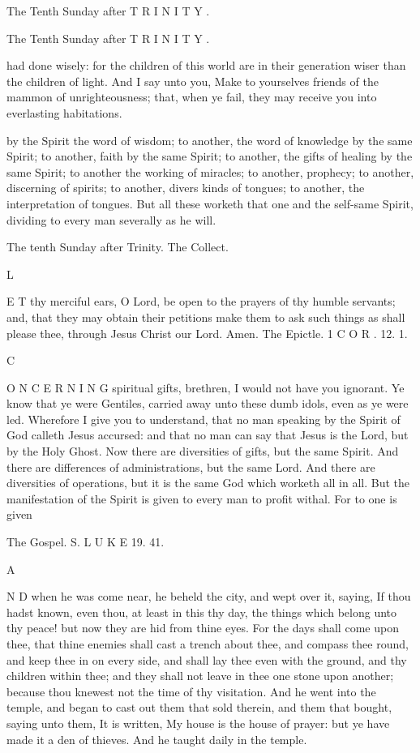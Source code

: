 The Tenth Sunday after T R I N I T Y .

The Tenth Sunday after T R I N I T Y .

had done wisely: for the children of this world are in their generation wiser than the children of light. And I say unto you, Make to yourselves friends of the mammon of unrighteousness; that, when ye fail, they may receive you into everlasting habitations.

by the Spirit the word of wisdom; to another, the word of knowledge by the same Spirit; to another, faith by the same Spirit; to another, the gifts of healing by the same Spirit; to another the working of miracles; to another, prophecy; to another, discerning of spirits; to another, divers kinds of tongues; to another, the interpretation of tongues. But all these worketh that one and the self-same Spirit, dividing to every man severally as he will.

The tenth Sunday after Trinity. The Collect.

L

E T thy merciful ears, O Lord, be open to the prayers of thy humble servants; and, that they may obtain their petitions make them to ask such things as shall please thee, through Jesus Christ our Lord. Amen. The Epictle. 1 C O R . 12. 1.

C

O N C E R N I N G spiritual gifts, brethren, I would not have you ignorant. Ye know that ye were Gentiles, carried away unto these dumb idols, even as ye were led. Wherefore I give you to understand, that no man speaking by the Spirit of God calleth Jesus accursed: and that no man can say that Jesus is the Lord, but by the Holy Ghost. Now there are diversities of gifts, but the same Spirit. And there are differences of administrations, but the same Lord. And there are diversities of operations, but it is the same God which worketh all in all. But the manifestation of the Spirit is given to every man to profit withal. For to one is given

The Gospel. S. L U K E 19. 41.

A

N D when he was come near, he beheld the city, and wept over it, saying, If thou hadst known, even thou, at least in this thy day, the things which belong unto thy peace! but now they are hid from thine eyes. For the days shall come upon thee, that thine enemies shall cast a trench about thee, and compass thee round, and keep thee in on every side, and shall lay thee even with the ground, and thy children within thee; and they shall not leave in thee one stone upon another; because thou knewest not the time of thy visitation. And he went into the temple, and began to cast out them that sold therein, and them that bought, saying unto them, It is written, My house is the house of prayer: but ye have made it a den of thieves. And he taught daily in the temple.

